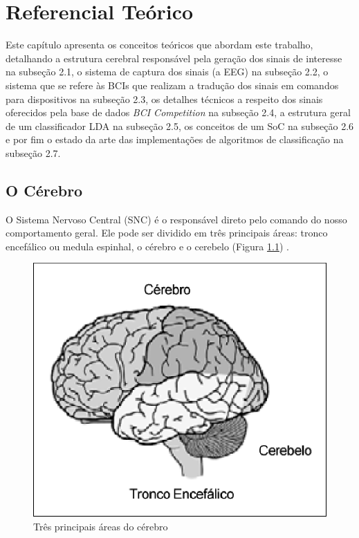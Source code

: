 
\chapter[Referencial Teórico]{Referencial Teórico}
Este capítulo apresenta os conceitos teóricos que abordam este trabalho, detalhando a estrutura cerebral responsável pela geração dos sinais de interesse na subseção 2.1, o sistema de captura dos sinais (a EEG) na subseção 2.2, o sistema que se refere às BCIs que realizam a tradução dos sinais em comandos para dispositivos na subseção 2.3, os detalhes técnicos a respeito dos sinais oferecidos pela base de dados \textit{BCI Competition} na subseção 2.4, a estrutura geral de um classificador LDA na subseção 2.5, os conceitos de um SoC na subseção 2.6 e por fim o estado da arte das implementações de algoritmos de classificação na subseção 2.7. 

\section{O Cérebro}
O Sistema Nervoso Central (SNC) é o responsável direto pelo comando do nosso comportamento geral\cite{David_Clarck}. Ele pode ser dividido em três principais áreas: tronco encefálico ou medula espinhal, o cérebro e o cerebelo (Figura \ref{BrainParts}) \cite{alvarezneurobiomecanismos}.

\begin{figure}[h]
	\centering
	\includegraphics[keepaspectratio=true,scale=1.0]{figuras/estrutura_cerebral.eps}
	\caption{Três principais áreas do cérebro \cite{alvarezneurobiomecanismos}}
	\label{BrainParts}
\end{figure}

